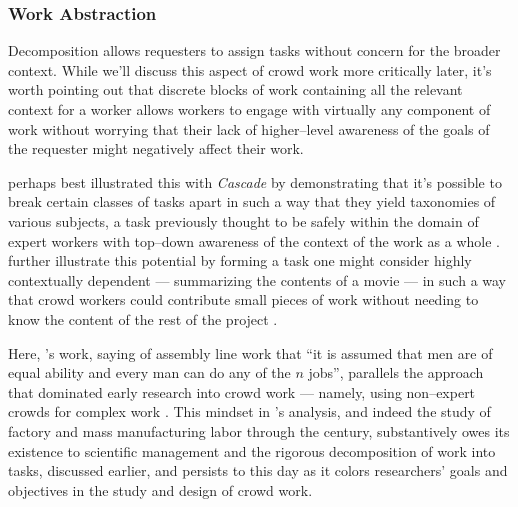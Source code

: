 \documentclass[trackingWork]{subfiles}
\begin{document}





\subsubsection{Work Abstraction}\label{sec:workAbstraction}
Decomposition allows requesters to assign tasks without concern for the broader context.
While we'll discuss this aspect of crowd work more critically later,
it's worth pointing out that discrete blocks of work containing all the relevant context for a worker
allows workers to engage with virtually any component of work without worrying that their lack of 
higher--level awareness of the goals of the requester might negatively affect their work.

\citeauthor{chilton2013cascade} perhaps best illustrated this with
\textit{Cascade} by demonstrating that it's possible to
break certain classes of tasks apart
in such a way that they yield taxonomies of various subjects,
a task previously thought to be safely within the domain of expert workers
with top--down awareness of the context of the work as a whole
\cite{chilton2013cascade}.
\citeauthor{verroios2014context} further illustrate this potential by
forming a task one might consider highly contextually dependent
--- summarizing the contents of a movie ---
in such a way that crowd workers could contribute small pieces of work without
needing to know the content of the rest of the project
\cite{verroios2014context}.

Here, \citeauthor{hu1961parallel}'s work,
saying of assembly line work that
``it is assumed that men are of equal ability and every man can do any of the $n$ jobs'',
parallels the approach that dominated early research into crowd work
--- namely, using non--expert crowds for complex work
\cite{hu1961parallel}.
This mindset in \citeauthor{hu1961parallel}'s analysis,
and indeed the study of factory and mass manufacturing labor through the  century,
substantively owes its existence to scientific management
and the rigorous decomposition of work into tasks, discussed earlier,
and persists to this day as it colors
researchers' goals and objectives in the study and design of crowd work.
\end{document}
